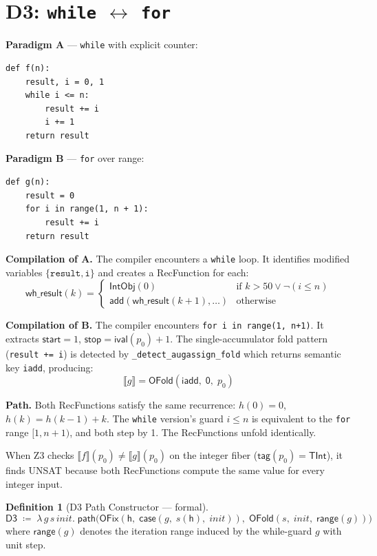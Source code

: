 \documentclass[11pt,a4paper]{report}
\theoremstyle{definition}
\newtheorem{definition}{Definition}[chapter]
\theoremstyle{plain}
\newcommand{\den}[1]{\llbracket #1 \rrbracket}
\begin{document}
\section{D3: \texttt{while} $\leftrightarrow$ \texttt{for}}
\label{sec:d3}

\textbf{Paradigm A} --- \texttt{while} with explicit counter:
\begin{lstlisting}
def f(n):
    result, i = 0, 1
    while i <= n:
        result += i
        i += 1
    return result
\end{lstlisting}

\textbf{Paradigm B} --- \texttt{for} over range:
\begin{lstlisting}
def g(n):
    result = 0
    for i in range(1, n + 1):
        result += i
    return result
\end{lstlisting}

\textbf{Compilation of A.}
The compiler encounters a \texttt{while} loop.  It identifies modified
variables $\{\texttt{result}, \texttt{i}\}$ and creates a RecFunction
for each:
\[
  \mathsf{wh\_result}(k) = \begin{cases}
    \mathsf{IntObj}(0) & \text{if } k > 50 \lor \lnot(i \leq n) \\
    \mathsf{add}(\mathsf{wh\_result}(k+1), \ldots)
      & \text{otherwise}
  \end{cases}
\]

\textbf{Compilation of B.}
The compiler encounters \texttt{for i in range(1, n+1)}.  It extracts
$\mathsf{start} = 1$, $\mathsf{stop} = \mathsf{ival}(p_0) + 1$.
The single-accumulator fold pattern
(\texttt{result += i}) is detected by \texttt{\_detect\_augassign\_fold}
which returns semantic key \texttt{iadd}, producing:
\[
  \den{g} = \mathsf{OFold}(\mathsf{iadd},\;
    \mathsf{0},\; p_0)
\]

\textbf{Path.}
Both RecFunctions satisfy the same recurrence:
$h(0) = 0$, $h(k) = h(k-1) + k$.
The \texttt{while} version's guard $i \leq n$ is equivalent to the
\texttt{for} range $[1, n+1)$, and both step by 1.  The RecFunctions
unfold identically.

When Z3 checks $\den{f}(p_0) \neq \den{g}(p_0)$ on the integer fiber
($\mathsf{tag}(p_0) = \mathsf{TInt}$), it finds UNSAT because both
RecFunctions compute the same value for every integer input.

\begin{definition}[D3 Path Constructor --- formal]
\label{def:d3-path}
\[
  \mathsf{D3} \;\coloneqq\; \lambda\, g\, s\, \mathit{init}.\;
  \mathsf{path}\!\big(
    \mathsf{OFix}(\mathsf{h},\;
      \mathsf{case}(g,\; s(\mathsf{h}),\; \mathit{init})),\;
    \mathsf{OFold}(s,\; \mathit{init},\; \mathsf{range}(g))
  \big)
\]
where $\mathsf{range}(g)$ denotes the iteration range induced by
the while-guard $g$ with unit step.
\end{definition}
\end{document}
